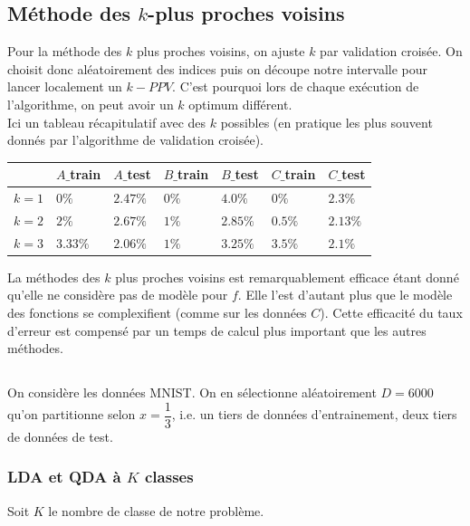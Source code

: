 \documentclass[paper=a4, fontsize=11pt]{article}
\begin{document}
\subsection{Méthode des $k$-plus proches voisins}
Pour la méthode des $k$ plus proches voisins, on ajuste $k$ par validation croisée. On choisit donc aléatoirement des indices puis on découpe notre intervalle pour lancer localement un $k-PPV$. C'est pourquoi lors de chaque exécution de l'algorithme, on peut avoir un $k$ optimum différent. \\Ici un tableau récapitulatif avec des $k$ possibles (en pratique les plus souvent donnés par l'algorithme de validation croisée). \\
\begin{center}
\begin{tabular}{|R{2cm}||C{1.5cm}|C{1.5cm}||C{1.5cm}|C{1cm}||C{1.5cm}|C{1.5cm}|}
\hline  & $A\_$train &  $A\_$test &  $B\_$train & $B\_$test & $C\_$train & $C\_$test\\
\hline  $k=1$ & $0 \%$ & $2.47\%$ & $0\%$ & $4.0\%$ & $0\%$ & $2.3\%$  \\
\hline  $k=2$ & $2 \%$ & $2.67\%$ & $1\%$ & $2.85\%$ & $0.5\%$ & $2.13\%$ 
\\
\hline  $k=3$ & $3.33 \%$ & $2.06\%$ & $1\%$ & $3.25\%$ & $3.5\%$ & $2.1\%$  \\
\hline
\end{tabular}
\end{center}
La méthodes des $k$ plus proches voisins est remarquablement efficace étant donné qu'elle ne considère pas de modèle pour $f$. Elle l'est d'autant plus que le modèle des fonctions se complexifient (comme sur les données $C$). Cette efficacité du taux d'erreur est compensé par un temps de calcul plus important que les autres méthodes. 

\subsection{}
On considère les données MNIST. On en sélectionne aléatoirement $D=6000$ qu'on partitionne selon $x=\dfrac{1}{3}$, i.e. un tiers de données d'entrainement, deux tiers de données de test. 
\subsubsection*{LDA et QDA à $K$ classes}
Soit $K$ le nombre de classe de notre problème. \\
\end{document}
